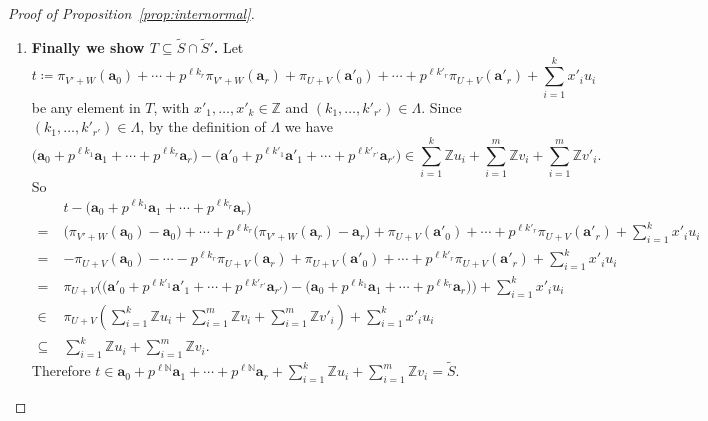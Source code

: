 \documentclass[letterpaper, 11pt, thm-restate]{article}
\numberwithin{equation}{section}
\newcommand{\Z}{\mathbb{Z}}
\newcommand{\N}{\mathbb{N}}
\newcommand{\tS}{\widetilde{S}}
\newcommand{\ba}{\boldsymbol{a}}
\theoremstyle{definition}
\theoremstyle{definition}
\theoremstyle{definition}
\begin{document}
\begin{proof}[Proof of Proposition~\ref{prop:internormal}]
\begin{enumerate}[wide, label = \arabic*.]
    \item \textbf{Finally we show $T \subseteq \tS \cap \tS'$.}
    Let
    \[
    t \coloneqq \pi_{V' + W}(\ba_0) + \cdots + p^{\ell k_r} \pi_{V' + W}(\ba_r) + \pi_{U + V}(\ba'_0) + \cdots + p^{\ell k'_r} \pi_{U + V}(\ba'_r) + \sum_{i = 1}^k x'_i u_i
    \]
    be any element in $T$, with $x'_1, \ldots, x'_k \in \Z$ and $(k_1, \ldots, k'_{r'}) \in \Lambda$.
    Since $(k_1, \ldots, k'_{r'}) \in \Lambda$, by the definition of $\Lambda$ we have
    \[
    \Big(\ba_0 + p^{\ell k_1} \ba_1 + \cdots + p^{\ell k_r} \ba_r\Big) - \Big(\ba'_0 + p^{\ell k'_1} \ba'_1 + \cdots + p^{\ell k'_{r'}} \ba_{r'}\Big) \in \sum_{i = 1}^k \Z u_i + \sum_{i = 1}^m \Z v_i + \sum_{i = 1}^m \Z v'_i.
    \]
    So
    \begin{align*}
        & t - \Big(\ba_0 + p^{\ell k_1} \ba_1 + \cdots + p^{\ell k_r} \ba_r\Big) \\
        = \; & \big(\pi_{V' + W}(\ba_0) - \ba_0 \big) + \cdots + p^{\ell k_r} \big(\pi_{V' + W}(\ba_r) - \ba_r \big) + \pi_{U + V}(\ba'_0) + \cdots + p^{\ell k'_r} \pi_{U + V}(\ba'_r) + \sum_{i = 1}^k x'_i u_i \\
        = \;& - \pi_{U + V}(\ba_0) - \cdots - p^{\ell k_r} \pi_{U + V}(\ba_r) + \pi_{U + V}(\ba'_0) + \cdots + p^{\ell k'_r} \pi_{U + V}(\ba'_r) + \sum_{i = 1}^k x'_i u_i \\
        = \; & \pi_{U+V} \Big( \big(\ba'_0 + p^{\ell k'_1} \ba'_1 + \cdots + p^{\ell k'_{r'}} \ba_{r'}\big) - \big(\ba_0 + p^{\ell k_1} \ba_1 + \cdots + p^{\ell k_r} \ba_r\big) \Big) + \sum_{i = 1}^k x'_i u_i \\
        \in \; & \pi_{U+V} \left( \sum_{i = 1}^k \Z u_i + \sum_{i = 1}^m \Z v_i + \sum_{i = 1}^m \Z v'_i \right) + \sum_{i = 1}^k x'_i u_i \\
        \subseteq \; & \sum_{i = 1}^k \Z u_i + \sum_{i = 1}^m \Z v_i.
    \end{align*}
    Therefore $t \in \ba_0 + p^{\ell \N} \ba_1 + \cdots + p^{\ell \N} \ba_r + \sum_{i = 1}^k \Z u_i + \sum_{i = 1}^m \Z v_i = \tS$.
    

\end{enumerate}
\end{proof}
\end{document}
